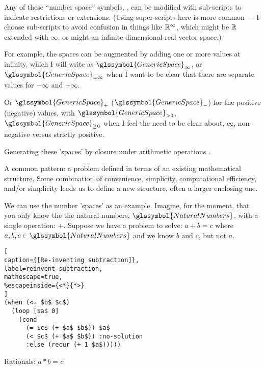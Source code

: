 Any of these ``number space'' symbols, ,
can be modified with sub-scripts to indicate restrictions or
extensions. 
(Using super-scripts here is more common --- I choose sub-scripts
to avoid confusion in things like $\mathbb{R}^{\infty}$,
which might be $\mathbb{R}$ extended with ${\infty}$, 
or might an infinite dimensional real vector space.)

For example, the spaces can be 
augmented by adding one or more values at infinity, which I will
write as $\glssymbol{GenericSpace}_{\infty}$,
or $\glssymbol{GenericSpace}_{\pm\infty}$ when I want to be 
clear that there are separate values for $-\infty$ and $+\infty$.

Or $\glssymbol{GenericSpace}_{+}$ ($\glssymbol{GenericSpace}_{-}$)
for the positive (negative) values, with 
$\glssymbol{GenericSpace}_{> 0}$, $\glssymbol{GenericSpace}_{\geq 0}$ 
when I feel the need to be clear about, eg, non-negative versus
strictly positive.


Generating these 'spaces' by closure under arithmetic operations
\cite{pickert-gorke-real-numbers-1974}.

A common pattern: a problem defined in terms of an existing mathematical
structure. Some combination of convenience, simplicity, computational
efficiency, and/or simplicity leads us to define a new structure, 
often a larger enclosing one.

We can use the number 'spaces' as an example.
Imagine, for the moment, that you only know the 
the natural numbers, $\glssymbol{NaturalNumbers}$, with a single operation: $+$.
Suppose we have a problem to solve:
\begin{math}
a + b = c
\end{math}
where $a,b,c\in \glssymbol{NaturalNumbers}$ and we know $b$ and $c$,
but not $a$.

\begin{minipage}{\linewidth}
\begin{lstlisting}[
caption={[Re-inventing subtraction]},
label=reinvent-subtraction,
mathescape=true,
%escapeinside={<*}{*>}
] 
(when (<= $b$ $c$)
  (loop [$a$ 0]
    (cond 
      (= $c$ (+ $a$ $b$)) $a$
      (< $c$ (+ $a$ $b$)) :no-solution
      :else (recur (+ 1 $a$)))))
\end{lstlisting}
\end{minipage}

Rationals: 
\begin{math}
a * b = c
\end{math}

